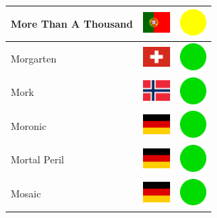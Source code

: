 \documentclass[12pt, a4paper, twoside]{report}
\begin{document}
\begin{center}
\begin{longtable}{|p{5cm}|p{2cm}|p{2cm}|}
 More Than A Thousand                                       & \includegraphics[width=1cm]{../4x3/pt} &   \includegraphics[width=1cm]{../likes/m} \\ \hline
 Morgarten                                                  & \includegraphics[width=1cm]{../4x3/ch} &   \includegraphics[width=1cm]{../likes/y} \\ \hline
 Mork                                                       & \includegraphics[width=1cm]{../4x3/no} &   \includegraphics[width=1cm]{../likes/y} \\ \hline
 Moronic                                                    & \includegraphics[width=1cm]{../4x3/de} &   \includegraphics[width=1cm]{../likes/y} \\ \hline
 Mortal Peril                                               & \includegraphics[width=1cm]{../4x3/de} &   \includegraphics[width=1cm]{../likes/y} \\ \hline
 Mosaic                                                     & \includegraphics[width=1cm]{../4x3/de} &   \includegraphics[width=1cm]{../likes/y} \\ \hline

\end{longtable}
\end{center}
\end{document}
